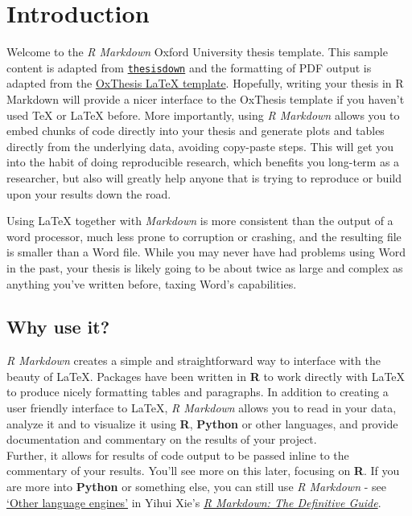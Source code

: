 \documentclass[a4paper, nobind]{templates/ociamthesis}
\begin{document}
\flushbottom

\hypertarget{introduction}{%
\chapter*{Introduction}\label{introduction}}

\adjustmtc

Welcome to the \emph{R Markdown} Oxford University thesis template.
This sample content is adapted from \href{https://github.com/ismayc/thesisdown}{\texttt{thesisdown}} and the formatting of PDF output is adapted from the \href{https://github.com/mcmanigle/OxThesis}{OxThesis LaTeX template}.
Hopefully, writing your thesis in R Markdown will provide a nicer interface to the OxThesis template if you haven't used TeX or LaTeX before.
More importantly, using \emph{R Markdown} allows you to embed chunks of code directly into your thesis and generate plots and tables directly from the underlying data, avoiding copy-paste steps.
This will get you into the habit of doing reproducible research, which benefits you long-term as a researcher, but also will greatly help anyone that is trying to reproduce or build upon your results down the road.

Using LaTeX together with \emph{Markdown} is more consistent than the output of a word processor, much less prone to corruption or crashing, and the resulting file is smaller than a Word file.
While you may never have had problems using Word in the past, your thesis is likely going to be about twice as large and complex as anything you've written before, taxing Word's capabilities.

\hypertarget{why-use-it}{%
\section*{Why use it?}\label{why-use-it}}

\emph{R Markdown} creates a simple and straightforward way to interface with the beauty of LaTeX.
Packages have been written in \textbf{R} to work directly with LaTeX to produce nicely formatting tables and paragraphs.
In addition to creating a user friendly interface to LaTeX, \emph{R Markdown} allows you to read in your data, analyze it and to visualize it using \textbf{R}, \textbf{Python} or other languages, and provide documentation and commentary on the results of your project.\\
Further, it allows for results of code output to be passed inline to the commentary of your results.
You'll see more on this later, focusing on \textbf{R}. If you are more into \textbf{Python} or something else, you can still use \emph{R Markdown} - see \href{https://bookdown.org/yihui/rmarkdown/language-engines.html}{`Other language engines'} in Yihui Xie's \href{https://bookdown.org/yihui/rmarkdown/language-engines.html}{\emph{R Markdown: The Definitive Guide}}.
\end{document}
